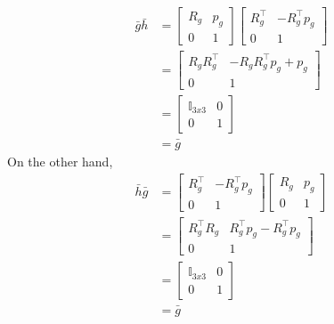 \documentclass[12pt]{article}
\newcommand{\I}{\mathbb{I}}
\begin{document}
\begin{enumerate}
\begin{enumerate}
                        \begin{align}
                            \bar{g} \bar{h} &=
                            \begin{bmatrix} 
                                R_g & p_g \\ 
                                0 & 1
                            \end{bmatrix} 
                            \begin{bmatrix} 
                                R_g^\top & -R_g^\top p_g \\ 
                                0 & 1
                            \end{bmatrix} \\
                            &= \begin{bmatrix} 
                                R_g R_g^\top & - R_g R_g^\top p_g + p_g \\ 
                                0 & 1
                            \end{bmatrix} \\
                            &= \begin{bmatrix} 
                                \I_{3x3} & 0 \\ 
                                0 & 1
                            \end{bmatrix} \\
                            &= \bar{g}
                        \end{align}
                        On the other hand,
                        \begin{align}
                            \bar{h} \bar{g}  &=
                            \begin{bmatrix} 
                                R_g^\top & -R_g^\top p_g \\ 
                                0 & 1
                            \end{bmatrix} 
                            \begin{bmatrix} 
                                R_g & p_g \\ 
                                0 & 1
                            \end{bmatrix}  \\
                            &= \begin{bmatrix} 
                                R_g^\top R_g  & R_g^\top p_g - R_g^\top p_g \\ 
                                0 & 1
                            \end{bmatrix} \\
                            &= \begin{bmatrix} 
                                \I_{3x3} & 0 \\ 
                                0 & 1
                            \end{bmatrix} \\
                            &= \bar{g}
                        \end{align}
                        

\end{enumerate}
\end{enumerate}
\end{document}

